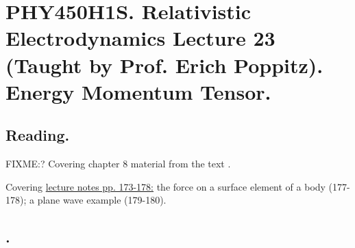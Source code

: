 
%

\chapter{PHY450H1S.  Relativistic Electrodynamics Lecture 23 (Taught by Prof. Erich Poppitz).  Energy Momentum Tensor.}
\label{chap:relativisticElectrodynamicsL23}
{}
\date{Mar 23, 2011}

\beginArtNoToc

\section{Reading.}

FIXME:?
Covering chapter 8 material from the text \cite{landau1980classical}.

Covering \href{http://www.physics.utoronto.ca/~poppitz/epoppitz/PHY450_files/RelEMpp166-180.pdf}{lecture notes pp. 173-178:} the force on a surface element of a body (177-178); a plane wave example (179-180).

\section{.}

\EndArticle
